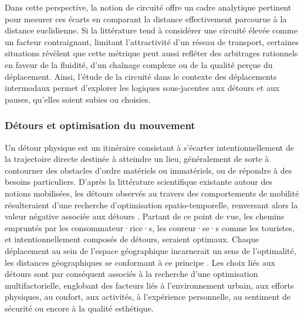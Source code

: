 \begin{refsegment}
Dans cette perspective, la notion de circuité offre un cadre analytique pertinent pour mesurer ces écarts en comparant la distance effectivement parcourue à la distance euclidienne. Si la littérature tend à considérer une circuité élevée comme un facteur contraignant, limitant l’attractivité d’un réseau de transport, certaines situations révèlent que cette métrique peut aussi refléter des arbitrages rationnels en faveur de la fluidité, d'un chaînage complexe ou de la qualité perçue du déplacement. Ainsi, l’étude de la circuité dans le contexte des déplacements intermodaux permet d’explorer les logiques sous-jacentes aux détours et aux pauses, qu’elles soient subies ou choisies.%

\subsubsection*{Détours et optimisation du mouvement
    \label{chap5:detours-optimisation}
    }

Un \gls{détour} physique est un itinéraire consistant à s'écarter intentionnellement de la trajectoire directe destinée à atteindre un lieu, généralement de sorte à contourner des obstacles d'ordre matériels ou immatériels, ou de répondre à des besoins particuliers. D'après la littérature scientifique existante autour des notions mobilisées, les détours observés au travers des comportements de mobilité résulteraient d'une recherche d'optimisation spatio-temporelle, renversant alors la valeur négative associée aux détours \textcolor{blue}{\autocite[459]{lhostis_detour_2017}}. Partant de ce point de vue, les chemins empruntés par les consommateur·rice·s, les coureur·se·s comme les touristes, et intentionnellement composés de détours, seraient optimaux. Chaque déplacement au sein de l'espace géographique incarnerait un sens de l'optimalité, les distances géographiques se conformant à ce principe \textcolor{blue}{\autocite[2]{lhostis_all_2020}}. Les choix liés aux détours sont par conséquent associés à la recherche d'une optimisation multifactorielle, englobant des facteurs liés à l'environnement urbain, aux efforts physiques, au confort, aux activités, à l'expérience personnelle, au sentiment de sécurité ou encore à la qualité esthétique.%


\end{refsegment}
